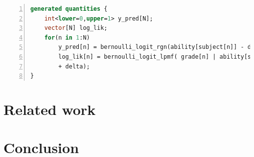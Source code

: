 \begin{lstlisting}[language=Stan,label={generated_quantities},basicstyle=\scriptsize, frame=l,framesep=4.5mm,framexleftmargin=2.5mm,tabsize=2,numbers=left,fillcolor=\color{blueforest!70},rulecolor=\color{blueforest},numberstyle=\normalfont\tiny\color{white}]
generated quantities {
	int<lower=0,upper=1> y_pred[N];
	vector[N] log_lik;
	for(n in 1:N)
		y_pred[n] = bernoulli_logit_rgn(ability[subject[n]] - difficulty[item[n]] + delta);
		log_lik[n] = bernoulli_logit_lpmf( grade[n] | ability[subject[n]] - difficulty[item[n]]
		+ delta);
}
\end{lstlisting}

\section{Related work}
\section{Conclusion}

